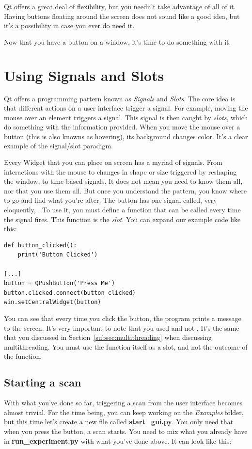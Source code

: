 Qt offers a great deal of flexibility, but you needn't take advantage of all of it. Having buttons floating around the screen does not sound like a good idea, but it's a possibility in case you ever do need it.

Now that you have a button on a window, it's time to do something with it.

\section{Using Signals and Slots}\label{sec:signals-slots}
Qt offers a programming pattern known as \emph{Signals} and \emph{Slots}. The core idea is that different actions on a user interface trigger a signal. For example, moving the mouse over an element triggers a signal. This signal is then caught by \emph{slots}, which do something with the information provided. When you move the mouse over a button (this is also knowns as hovering), its background changes color. It's a clear example of the signal/slot paradigm.

Every Widget that you can place on screen has a myriad of signals. From interactions with the mouse to changes in shape or size triggered by reshaping the window, to time-based signals. It does not mean you need to know them all, nor that you use them all. But once you understand the pattern, you know where to go and find what you're after. The button has one signal called, very eloquently, . To use it, you must define a function that can be called every time the signal fires. This function is the \emph{slot}. You can expand our example code like this:

\begin{verbatim}
def button_clicked():
    print('Button Clicked')

[...]
button = QPushButton('Press Me')
button.clicked.connect(button_clicked)
win.setCentralWidget(button)
\end{verbatim}

You can see that every time you click the button, the program prints a message to the screen. It's very important to note that you used  and not . It's the same that you discussed in Section~\ref{subsec:multithreading} when discussing multithreading. You must use the function itself as a slot, and not the outcome of the function.

\subsection{Starting a scan}\label{subsec:start-scan-gui}
With what you've done so far, triggering a scan from the user interface becomes almost trivial. For the time being, you can keep working on the \emph{Examples} folder, but this time let's create a new file called \textbf{start\_gui.py}. You only need that when you press the button, a scan starts. You need to mix what you already have in \textbf{run\_experiment.py} with what you've done above. It can look like this:

